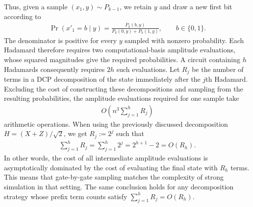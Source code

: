 Thus, given a sample $(x_1,y)\sim P_{k-1}$, we retain $y$ and draw a new first bit according to
\begin{align}
    \Pr(x'_1=b\mid y)
    =\frac{P_k(b,y)}{P_k(0,y)+P_k(1,y)},
    \qquad b\in\{0,1\}.
\end{align}
The denominator is positive for every $y$ sampled with nonzero probability.
Each Hadamard therefore requires two computational-basis amplitude evaluations, whose squared magnitudes give the required probabilities.
A circuit containing $h$ Hadamards consequently requires $2h$ such evaluations.
Let $R_j$ be the number of terms in a DCP decomposition of the state immediately after the $j$th Hadamard.
Excluding the cost of constructing these decompositions and sampling from the resulting probabilities, the amplitude evaluations required for one sample take
\begin{align}
    O\left(n^3\sum_{j=1}^{h}R_j\right)
\end{align}
arithmetic operations.
When using the previously discussed decomposition $H=(X+Z)/\sqrt{2}$, we get $R_j := 2^j$ such that
\begin{align}
    \sum_{j=1}^{h}R_j
    =\sum_{j=1}^{h}2^j
    =2^{h+1}-2
    = O(R_h).
\end{align}
In other words, the cost of all intermediate amplitude evaluations is asymptotically dominated by the cost of evaluating the final state with $R_h$ terms.
This means that gate-by-gate sampling matches the complexity of strong simulation in that setting.
The same conclusion holds for any decomposition strategy whose prefix term counts satisfy $\sum_{j=1}^{h}R_j=O(R_h)$.
